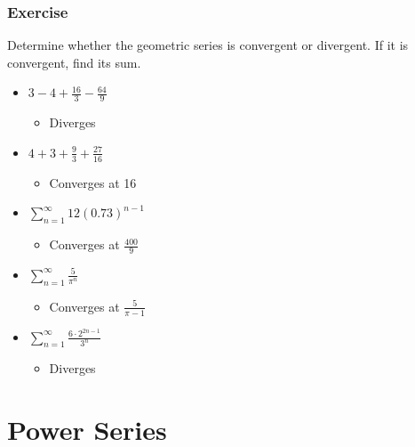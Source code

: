 \documentclass[t]{beamer}
\theoremstyle{plain}
\theoremstyle{definition}
\begin{document}
\begin{frame}
\footnotesize
\frametitle{Exercise}

Determine whether the geometric series is convergent or divergent.  If it is convergent, find its sum.

\begin{itemize}
	\item $3 - 4 + \frac{16}{3} - \frac{64}{9}$ %
		\begin{itemize}
			\item Diverges
		\end{itemize}
	\item $4 + 3 + \frac{9}{3} + \frac{27}{16}$ %
		\begin{itemize}
			\item Converges at 16
		\end{itemize}
	\item $\displaystyle\sum_{n=1}^{\infty}12(0.73)^{n-1}$ %
		\begin{itemize}
			\item Converges at $\frac{400}{9}$
		\end{itemize}
	\item $\displaystyle\sum_{n=1}^{\infty}\frac{5}{\pi^n}$ %
		\begin{itemize}
			\item Converges at $\frac{5}{\pi - 1}$
		\end{itemize}
	\item $\displaystyle\sum_{n=1}^{\infty}\frac{6 \cdot 2^{2n-1}}{3^n}$ %
	\begin{itemize}
		\item Diverges
	\end{itemize}
\end{itemize}


\end{frame}


\section{Power Series}
\end{document}
